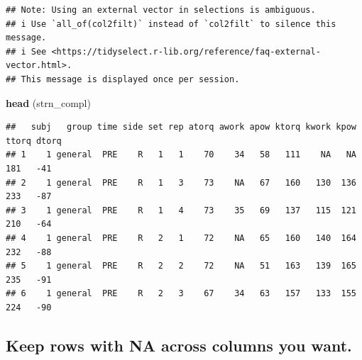 \documentclass[
]{book}
\newenvironment{Shaded}{\begin{snugshade}}{\end{snugshade}}
\newcommand{\CommentTok}[1]{\textcolor[rgb]{0.56,0.35,0.01}{\textit{#1}}}
\newcommand{\KeywordTok}[1]{\textcolor[rgb]{0.13,0.29,0.53}{\textbf{#1}}}
\newcommand{\NormalTok}[1]{#1}
\newcommand{\OperatorTok}[1]{\textcolor[rgb]{0.81,0.36,0.00}{\textbf{#1}}}
\newcommand{\StringTok}[1]{\textcolor[rgb]{0.31,0.60,0.02}{#1}}
\begin{document}
\begin{Shaded}
\end{Shaded}

\begin{verbatim}
## Note: Using an external vector in selections is ambiguous.
## i Use `all_of(col2filt)` instead of `col2filt` to silence this message.
## i See <https://tidyselect.r-lib.org/reference/faq-external-vector.html>.
## This message is displayed once per session.
\end{verbatim}

\begin{Shaded}
\begin{Highlighting}[]
\KeywordTok{head}\NormalTok{ (strn_compl)}
\end{Highlighting}
\end{Shaded}

\begin{verbatim}
##   subj   group time side set rep atorq awork apow ktorq kwork kpow ttorq dtorq
## 1    1 general  PRE    R   1   1    70    34   58   111    NA   NA   181   -41
## 2    1 general  PRE    R   1   3    73    NA   67   160   130  136   233   -87
## 3    1 general  PRE    R   1   4    73    35   69   137   115  121   210   -64
## 4    1 general  PRE    R   2   1    72    NA   65   160   140  164   232   -88
## 5    1 general  PRE    R   2   2    72    NA   51   163   139  165   235   -91
## 6    1 general  PRE    R   2   3    67    34   63   157   133  155   224   -90
\end{verbatim}

\hypertarget{keep-rows-with-na-across-columns-you-want.}{%
\subsection{\texorpdfstring{Keep rows \textbf{with} NA across columns you want.}{Keep rows with NA across columns you want.}}\label{keep-rows-with-na-across-columns-you-want.}}
\end{document}
